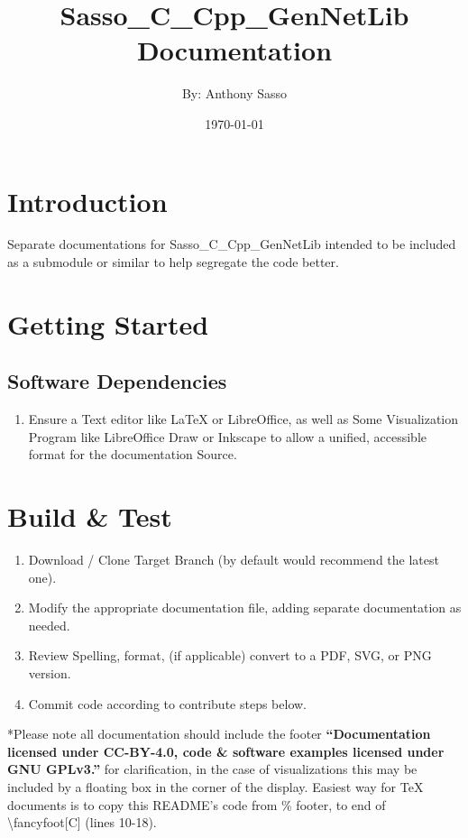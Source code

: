 \documentclass{article}
\title      {\Huge Sasso\_C\_Cpp\_GenNetLib Documentation}
\author     {By: Anthony Sasso}
\date       {\today}
\begin{document}
\maketitle

\tableofcontents

\newpage
\section{Introduction}
Separate documentations for Sasso\_C\_Cpp\_GenNetLib intended to be included as a submodule or similar to help segregate the code better.

\section{Getting Started}
\subsection{Software Dependencies}
\begin{enumerate}
    \item Ensure a Text editor like LaTeX or LibreOffice, as well as Some Visualization Program like LibreOffice Draw or Inkscape to allow a unified, accessible format for the documentation Source.
\end{enumerate}

\section{Build \& Test}
\begin{enumerate}
    \item Download / Clone Target Branch (by default would recommend the latest one).
    \item Modify the appropriate documentation file, adding separate documentation as needed.
    \item Review Spelling, format, (if applicable) convert to a PDF, SVG, or PNG version.
    \item Commit code according to contribute steps below.
\end{enumerate}

*Please note all documentation should include the footer \textbf{``Documentation licensed under CC-BY-4.0, code \& software examples licensed under GNU GPLv3.''} for clarification, in the case of visualizations this may be included by a floating box in the corner of the display. Easiest way for TeX documents is to copy this README's code from \% footer, to end of \textbackslash{}fancyfoot[C] (lines 10-18).
\end{document}
